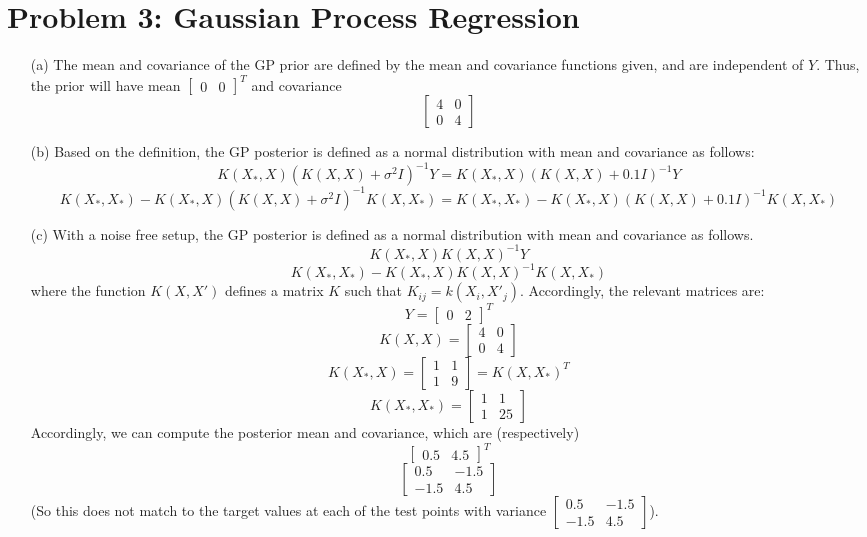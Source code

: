 \documentclass{article}
\begin{document}
\section*{Problem 3: Gaussian Process Regression}
\begin{enumerate}
	\item[(a)] The mean and covariance of the GP prior are defined by the mean and covariance functions given, and are independent of $Y$. Thus, the prior will have mean $\begin{bmatrix} 0 & 0\end{bmatrix}^T$ and covariance
	$$\begin{bmatrix} 4 & 0  \\ 0 & 4\end{bmatrix}$$
	\item[(b)] Based on the definition, the GP posterior is defined as a normal distribution with mean and covariance as follows:
	$$K(X_*, X)(K(X, X)+\sigma^2I)^{-1}Y=K(X_*, X)(K(X, X)+0.1I)^{-1}Y$$
	$$K(X_*, X_*) - K(X_*,X)(K(X, X)+\sigma^2I)^{-1}K(X, X_*)=K(X_*, X_*) - K(X_*,X)(K(X, X)+0.1I)^{-1}K(X, X_*)$$
	\item[(c)] With a noise free setup, the GP posterior is defined as a normal distribution with mean and covariance as follows.
	$$K(X_*, X)K(X, X)^{-1}Y$$
	$$K(X_*, X_*) - K(X_*,X)K(X, X)^{-1}K(X, X_*)$$
	where the function $K(X, X')$ defines a matrix $K$ such that $K_{ij} = k(X_i, X'_j)$. Accordingly, the relevant matrices are:
	$$Y = \begin{bmatrix} 0 & 2 \end{bmatrix}^T$$
	$$K(X, X) = \begin{bmatrix} 4 & 0  \\ 0 & 4\end{bmatrix}$$
	$$K(X_*, X) = \begin{bmatrix} 1 & 1 \\ 1 & 9\end{bmatrix} = K(X, X_*)^T$$
	$$K(X_*, X_*) = \begin{bmatrix} 1 & 1 \\ 1 & 25 \end{bmatrix}$$
	Accordingly, we can compute the posterior mean and covariance, which are (respectively)
	$$\begin{bmatrix} 0.5 & 4.5 \end{bmatrix}^T$$
	$$\begin{bmatrix} 0.5 & -1.5 \\ -1.5 & 4.5 \end{bmatrix}$$
	(So this does not match to the target values at each of the test points with variance $\begin{bmatrix} 0.5 & -1.5 \\ -1.5 & 4.5 \end{bmatrix}$).
\end{enumerate}
\end{document}
